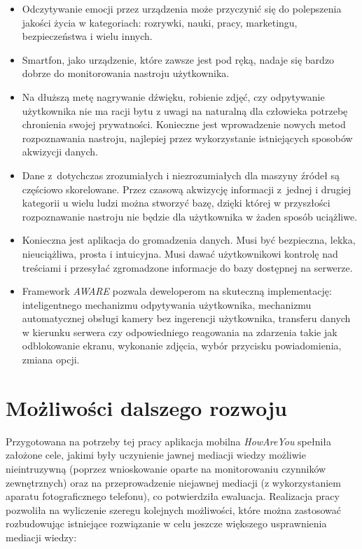 \begin{itemize}
	\item Odczytywanie emocji przez urządzenia może przyczynić się do polepszenia jakości życia w kategoriach: rozrywki, nauki, pracy, marketingu, bezpieczeństwa i wielu innych.
	
	\item Smartfon, jako urządzenie, które zawsze jest pod ręką, nadaje się bardzo dobrze do monitorowania nastroju użytkownika.
	
	\item Na dłuższą metę nagrywanie dźwięku, robienie zdjęć, czy odpytywanie użytkownika nie ma racji bytu z uwagi na naturalną dla człowieka potrzebę chronienia swojej prywatności. Konieczne jest wprowadzenie nowych metod rozpoznawania nastroju, najlepiej przez wykorzystanie istniejących sposobów akwizycji danych.
	
	\item Dane z~dotychczas zrozumiałych i niezrozumiałych dla maszyny źródeł są częściowo skorelowane. Przez czasową akwizycję informacji z~jednej i drugiej kategorii u wielu ludzi można stworzyć bazę, dzięki której w przyszłości rozpoznawanie nastroju nie będzie dla użytkownika w żaden sposób uciążliwe.
	
	\item Konieczna jest aplikacja do gromadzenia danych. Musi być bezpieczna, lekka, nieuciążliwa, prosta i intuicyjna. Musi dawać użytkownikowi kontrolę nad treściami i przesyłać zgromadzone informacje do bazy dostępnej na serwerze.
	
	\item Framework \textit{AWARE} pozwala deweloperom na skuteczną implementację: inteligentnego mechanizmu odpytywania użytkownika, mechanizmu automatycznej obsługi kamery bez ingerencji użytkownika, transferu danych w kierunku serwera czy odpowiedniego reagowania na zdarzenia takie jak odblokowanie ekranu, wykonanie zdjęcia, wybór przycisku powiadomienia, zmiana opcji.
\end{itemize}



\section{Możliwości dalszego rozwoju}
\label{sec:mozwliwosciDalszegoRozwoju}

Przygotowana na potrzeby tej pracy aplikacja mobilna \textit{HowAreYou} spełniła założone cele, jakimi były uczynienie jawnej mediacji wiedzy możliwie nieintruzywną (poprzez wnioskowanie oparte na monitorowaniu czynników zewnętrznych) oraz na przeprowadzenie niejawnej mediacji (z wykorzystaniem aparatu fotograficznego telefonu), co potwierdziła ewaluacja. Realizacja pracy pozwoliła na wyliczenie szeregu kolejnych możliwości, które można zastosować rozbudowując istniejące rozwiązanie w celu jeszcze większego usprawnienia mediacji wiedzy:

